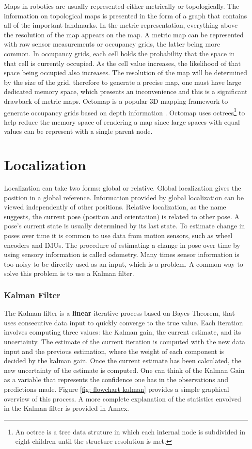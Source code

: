 Maps in robotics are usually represented either metrically or topologically. The information on topological maps is presented in the form of a graph that contains all of the important landmarks. In the metric representation, everything above the resolution of the map appears on the map. A metric map can be represented with raw sensor measurements or occupancy grids, the latter being more common. In occupancy grids, each cell holds the probability that the space in that cell is currently occupied. As the cell value increases, the likelihood of that space being occupied also increases. The resolution of the map will be determined by the size of the grid, therefore to generate a precise map, one must have large dedicated memory space, which presents an inconvenience and this is a significant drawback of metric maps. Octomap is a popular 3D mapping framework to generate occupancy grids based on depth information \cite{hornung_octomap_2013}. Octomap uses octrees\footnote{An octree is a tree data struture in which each internal node is subdivided in eight children until the structure resolution is met.} to help reduce the memory space of rendering a map since large spaces with equal values can be represent with a single parent node.

\section{Localization}
Localization can take two forms: global or relative. Global localization gives the position in a global reference. Information provided by global localization can be viewed independently of other positions.
Relative localization, as the name suggests, the current pose (position and orientation) is related to other pose. A pose's current state is usually determined by its last state. To estimate change in poses over time it is common to use data from motion sensors, such as wheel encoders and \acs*{IMU}s. The procedure of estimating a change in pose over time by using sensory information is called odometry. 
Many times sensor information is too noisy to be directly used as an input, which is a problem. A common way to solve this problem is to use a Kalman filter.

\subsubsection{Kalman Filter}
The Kalman filter is a \textbf{linear} iterative process based on Bayes Theorem, that uses consecutive data input to quickly converge to the true value. Each iteration involves computing three values: the Kalman gain, the current estimate, and its uncertainty. The estimate of the current iteration is computed with the new data input and the previous estimation, where the weight of each component is decided by the kalman gain. Once the current estimate has been calculated, the new uncertainty of the estimate is computed. One can think of the Kalman Gain as a variable that represents the confidence one has in the observations and predictions made. Figure \ref*{fig: flowchart kalman} provides a simple graphical overview of this process. A more complete explanation of the statistics envolved in the Kalman filter is provided in Annex. 

